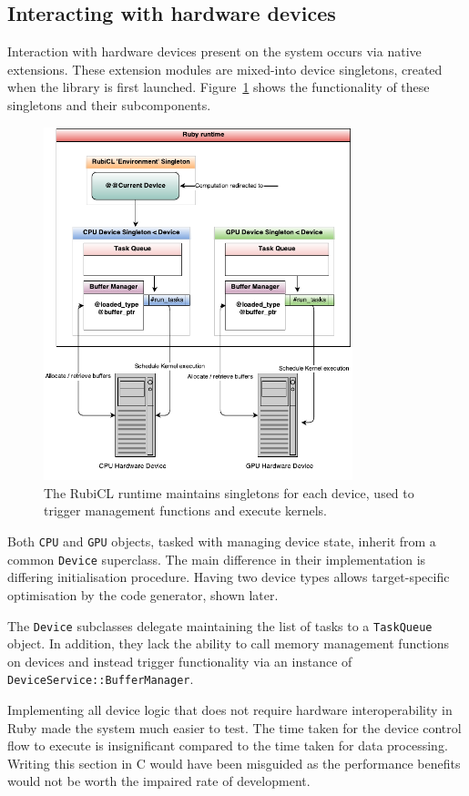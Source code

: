 \subsection{Interacting with hardware devices}
Interaction with hardware devices present on the system occurs via native extensions. These extension modules are mixed-into device singletons, created when the library is first launched. Figure~\ref{fig:rubicl_devices} shows the functionality of these singletons and their subcomponents.

\begin{figure}[h]
  \includegraphics[width=0.8\textwidth]{./figures/arch_diagram.pdf}
  \caption{The RubiCL runtime maintains singletons for each device, used to trigger management functions and execute kernels.}
  \label{fig:rubicl_devices}
\end{figure}

Both \verb|CPU| and \verb|GPU| objects, tasked with managing device state, inherit from a common \verb|Device| superclass. The main difference in their implementation is differing initialisation procedure. Having two device types allows target-specific optimisation by the code generator, shown later.

The \verb|Device| subclasses delegate maintaining the list of tasks to a \verb|TaskQueue| object. In addition, they lack the ability to call memory management functions on devices and instead trigger functionality via an instance of \verb|DeviceService::BufferManager|.

Implementing all device logic that does not require hardware interoperability in Ruby made the system much easier to test. The time taken for the device control flow to execute is insignificant compared to the time taken for data processing. Writing this section in C would have been misguided as the performance benefits would not be worth the impaired rate of development.
